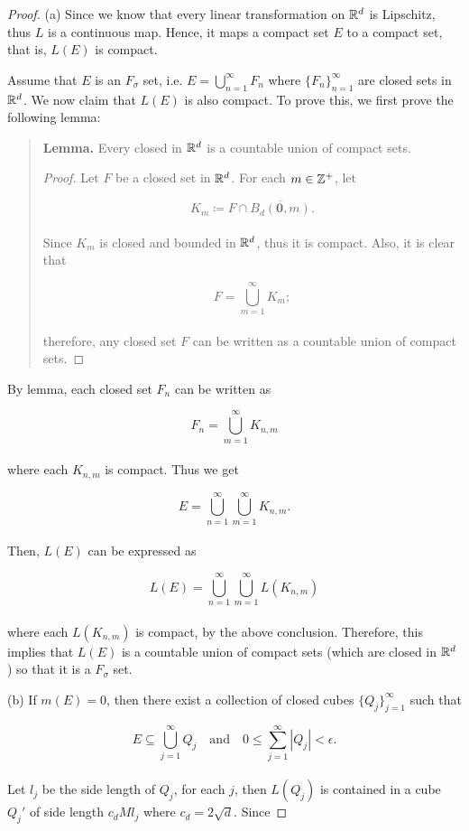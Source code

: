 \documentclass[12pt, a4paper, openany, twoside]{book}
\theoremstyle{definition}
\theoremstyle{remark}
\newcommand{\ov}{\overline}
\theoremstyle{plain}
\numberwithin{equation}{section}
\begin{document}
\begin{proof}
    (a) Since we know that every linear transformation on ${\mathbb {R}}^d$ is Lipschitz, thus $L$ is a continuous map. Hence, it maps a compact set $E$ to a compact set, that is, $L(E)$ is compact. 

    Assume that $E$ is an $F_\sigma$ set, i.e. $E=\bigcup_{n=1}^{\infty}{F_n}$ where $\{F_n\}_{n=1}^{\infty}$ are closed sets in ${\mathbb {R}}^d$. We now claim that $L(E)$ is also compact. To prove this, we first prove the following lemma:
    \vspace{5mm}
    
    \begin{quote}
        \textbf{Lemma.} Every closed in ${\mathbb {R}}^d$ is a countable union of compact sets.
        \begin{proof}
            Let $F$ be a closed set in ${\mathbb {R}}^d$. For each $m\in{\mathbb {Z}}^+$, let

            \[K_m\coloneqq F\cap\ov{B_d(\mathbf{0},m)}.\]
            \\
            Since $K_m$ is closed and bounded in ${\mathbb {R}}^d$, thus it is compact. Also, it is clear that

            \[F=\bigcup_{m=1}^{\infty}{K_m};\]
            \\
            therefore, any closed set $F$ can be written as a countable union of compact sets.
        \end{proof}
    \end{quote}
    \vspace{5mm}
    By lemma, each closed set $F_n$ can be written as 

    \[F_n=\bigcup_{m=1}^{\infty}{K_{n,m}}\]
    \\
    where each $K_{n,m}$ is compact. Thus we get 

    \[E=\bigcup_{n=1}^{\infty}{\bigcup_{m=1}^{\infty}{K_{n,m}}}.\]
    \\
    Then, $L(E)$ can be expressed as 

    \[L(E)=\bigcup_{n=1}^{\infty}{\bigcup_{m=1}^{\infty}{L(K_{n,m})}}\]
    \\
    where each $L(K_{n,m})$ is compact, by the above conclusion. Therefore, this implies that $L(E)$ is a countable union of compact sets (which are closed in ${\mathbb {R}}^d$) so that it is a $F_\sigma$ set.

    \vspace{5mm}
    (b) If $m(E)=0$, then there exist a collection of closed cubes $\{Q_j\}_{j=1}^{\infty}$ such that 

    \[E\subseteq\bigcup_{j=1}^{\infty}{Q_j}\quad\text{and}\quad 0\leq\sum_{j=1}^{\infty}{|Q_j|}<\epsilon.\]
    \\
    Let $l_j$ be the side length of $Q_j$, for each $j$, then $L(Q_j)$ is contained in a cube $Q_j'$ of side length $c_dMl_j$ where $c_d=2\sqrt{d}$. Since


\end{proof}
\end{document}
